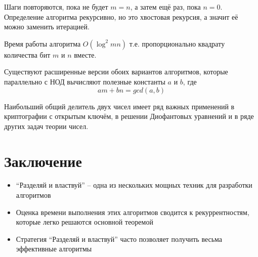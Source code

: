 \documentclass[a4paper,11pt]{article}
\begin{document}
Шаги повторяются, пока не будет $m = n$, а затем ещё раз, пока $n = 0$.
Определение алгоритма рекурсивно, но это хвостовая рекурсия, а значит её
можно заменить итерацией.

Время работы алгоритма $O(\log^2 m n)$ т.е. пропорционально квадрату
количества бит $m$ и $n$ вместе.

Существуют расширенные версии обоих вариантов алгоритмов, которые параллельно с
НОД вычисляют полезные константы $a$ и $b$, где
\begin{equation*}
  a m + b n = gcd(a, b)
\end{equation*}

Наибольший общий делитель двух чисел имеет ряд важных применений в криптографии
с открытым ключём, в решении Диофантовых уравнений и в ряде других задач
теории чисел.

\section*{Заключение}
\begin{itemize}
\item ``Разделяй и властвуй'' -- одна из нескольких мощных техник для разработки
  алгоритмов
\item Оценка времени выполнения этих алгоритмов сводится к рекуррентностям,
  которые легко решаются основной теоремой
\item Стратегия ``Разделяй и властвуй'' часто позволяет получить весьма
  эффективные алгоритмы
\end{itemize}
\end{document}
